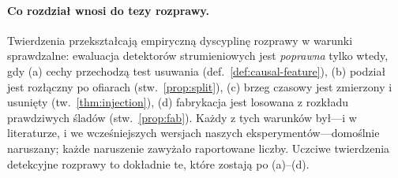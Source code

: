 \paragraph{Co rozdział wnosi do tezy rozprawy.}
Twierdzenia przekształcają empiryczną dyscyplinę rozprawy w warunki
sprawdzalne: ewaluacja detektorów strumieniowych jest \emph{poprawna}
tylko wtedy, gdy (a) cechy przechodzą test usuwania
(def.~\ref{def:causal-feature}), (b) podział jest rozłączny po ofiarach
(stw.~\ref{prop:split}), (c) brzeg czasowy jest zmierzony i usunięty
(tw.~\ref{thm:injection}), (d) fabrykacja jest losowana z rozkładu
prawdziwych śladów (stw.~\ref{prop:fab}). Każdy z tych warunków był---i w
literaturze, i we wcześniejszych wersjach naszych eksperymentów---domoślnie
naruszany; każde naruszenie zawyżało raportowane liczby. Uczciwe
twierdzenia detekcyjne rozprawy to dokładnie te, które zostają po
(a)--(d).
